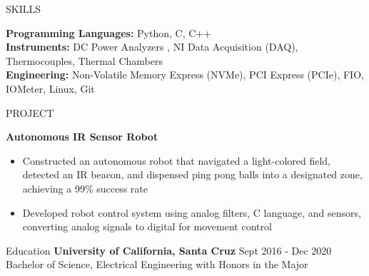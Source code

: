 \documentclass{resume} %
\begin{document}
\begin{rSection}{SKILLS}


\textbf{Programming Languages: }Python, C, C++ \\
\textbf{Instruments: }DC Power Analyzers , NI Data Acquisition (DAQ), Thermocouples, Thermal Chambers\\
\textbf{Engineering: }Non-Volatile Memory Express (NVMe), PCI Express (PCIe), FIO, IOMeter, Linux, Git 
\end{rSection}


\begin{rSection}{PROJECT}

 \textbf{Autonomous IR Sensor Robot} \hfill {}
  \begin{itemize}[left=1em]
  \itemsep -0.5em \vspace{-0.5em}
    \item Constructed an autonomous robot that navigated a light-colored field, detected an IR beacon, and dispensed ping pong balls into a designated zone, achieving a 99\% success rate
    \item Developed robot control system using analog filters, C language, and sensors, converting analog signals to digital for movement control
  \end{itemize}


\end{rSection}

\begin{rSection}{Education}
{\bf University of California, Santa Cruz} \hfill {Sept 2016 - Dec 2020} 
\\ Bachelor of Science, Electrical Engineering with Honors in the Major\hfill 

\end{rSection}

\end{document}
